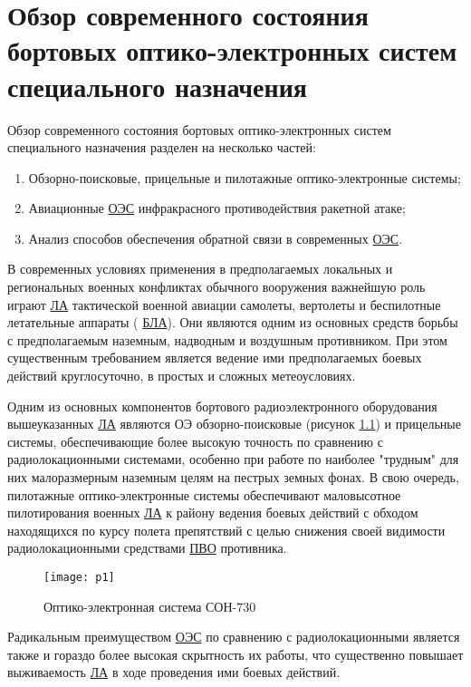 \chapter{Обзор современного состояния бортовых оптико-электронных систем специального назначения} \label{ch:ch1}

Обзор современного состояния бортовых оптико-электронных систем специального назначения разделен на несколько частей:
\begin{enumerate}
 \item Обзорно-поисковые, прицельные и пилотажные оптико-электронные системы;
 \item Авиационные \hyperref[acroEOS]{ОЭС} инфракрасного противодействия ракетной атаке;
 \item Анализ способов обеспечения обратной связи в современных  \hyperref[acroEOS]{ОЭС}.
\end{enumerate}

В современных условиях применения в предполагаемых локальных и региональных военных конфликтах обычного вооружения важнейшую роль играют  \hyperref[acroLA]{ЛА} тактической военной авиации самолеты, вертолеты и беспилотные летательные аппараты ( \hyperref[acroUAV]{БЛА}). Они являются одним из основных средств борьбы с предполагаемым наземным, надводным и воздушным противником. При этом существенным требованием является ведение ими предполагаемых боевых действий круглосуточно, в простых и сложных метеоусловиях. 

Одним из основных компонентов бортового радиоэлектронного оборудования вышеуказанных  \hyperref[acroLA]{ЛА} являются ОЭ обзорно-поисковые 
(рисунок \ref{fig:soep}) и прицельные системы, обеспечивающие более высокую точность по сравнению с радиолокационными системами, особенно при работе по наиболее "трудным" для них малоразмерным наземным целям на пестрых земных фонах. В свою очередь, пилотажные оптико-электронные системы обеспечивают маловысотное пилотирования военных  \hyperref[acroLA]{ЛА} к району ведения боевых действий с обходом находящихся по курсу полета препятствий с целью снижения своей видимости радиолокационными средствами  \hyperref[acroPVO]{ПВО} противника.

\begin{figure}[ht]
	\centering
 \texttt{[image: p1]} 
 \caption{Оптико-электронная система СОН-730}
 \label{fig:soep}
\end{figure}

Радикальным преимуществом \hyperref[acroEOS]{ОЭС} по сравнению с радиолокационными является также и гораздо более высокая скрытность их работы, что существенно повышает выживаемость  \hyperref[acroLA]{ЛА} в ходе проведения ими боевых действий. 

